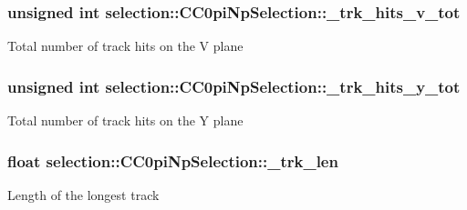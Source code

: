 \subsubsection[{\texorpdfstring{\+\_\+trk\+\_\+hits\+\_\+v\+\_\+tot}{_trk_hits_v_tot}}]{\setlength{\rightskip}{0pt plus 5cm}unsigned int selection\+::\+C\+C0pi\+Np\+Selection\+::\+\_\+trk\+\_\+hits\+\_\+v\+\_\+tot\hspace{0.3cm}{\ttfamily [private]}}\hypertarget{classselection_1_1CC0piNpSelection_a30fe5ccb6a299f7955125aa6c9d5923d}{}\label{classselection_1_1CC0piNpSelection_a30fe5ccb6a299f7955125aa6c9d5923d}
Total number of track hits on the V plane 
\subsubsection[{\texorpdfstring{\+\_\+trk\+\_\+hits\+\_\+y\+\_\+tot}{_trk_hits_y_tot}}]{\setlength{\rightskip}{0pt plus 5cm}unsigned int selection\+::\+C\+C0pi\+Np\+Selection\+::\+\_\+trk\+\_\+hits\+\_\+y\+\_\+tot\hspace{0.3cm}{\ttfamily [private]}}\hypertarget{classselection_1_1CC0piNpSelection_a76eb07fcb9190709464880c0ea7c4eba}{}\label{classselection_1_1CC0piNpSelection_a76eb07fcb9190709464880c0ea7c4eba}
Total number of track hits on the Y plane 
\subsubsection[{\texorpdfstring{\+\_\+trk\+\_\+len}{_trk_len}}]{\setlength{\rightskip}{0pt plus 5cm}float selection\+::\+C\+C0pi\+Np\+Selection\+::\+\_\+trk\+\_\+len\hspace{0.3cm}{\ttfamily [private]}}\hypertarget{classselection_1_1CC0piNpSelection_aab7945993678b44d7100abac6cc71655}{}\label{classselection_1_1CC0piNpSelection_aab7945993678b44d7100abac6cc71655}
Length of the longest track 
